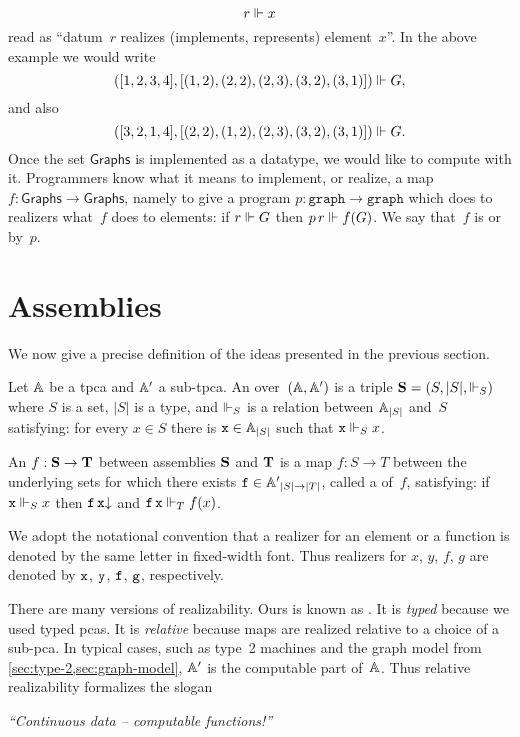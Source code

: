 %
\begin{equation*}
  r \rz x
\end{equation*}
%
read as ``datum~$r$ realizes (implements, represents) element~$x$''. In the above example we would write
%
\begin{equation*}
([1, 2, 3, 4], [(1,2), (2,2), (2,3), (3,2), (3,1)]) \rz G,
\end{equation*}
%
and also
%
\begin{equation*}
([3, 2, 1, 4], [(2,2), (1,2), (2,3), (3,2), (3,1)]) \rz G.
\end{equation*}
%
Once the set $\mathsf{Graphs}$ is implemented as a datatype, we would like to compute with it.
%
Programmers know what it means to implement, or realize, a map $f : \mathsf{Graphs} \to \mathsf{Graphs}$, namely to give a program $p : \mathtt{graph} \to \mathtt{graph}$ which does to realizers what~$f$ does to elements: if $r \rz G$ then $p \, r \rz f(G)$. We say that~$f$ is  or  by~$p$.

\section{Assemblies}
\label{sec:assemblies}

We now give a precise definition of the ideas presented in the previous section.

\begin{definition}
  Let $\AA$ be a tpca and $\subAA$ a sub-tpca. An  over~$(\AA, \subAA)$ is a triple
  $\asm{S} = \xasm{S}$ where $S$ is a set, $|S|$ is a type, and $\rz_S$ is a relation between $\xAtyp{S}$ and~$S$
  satisfying: for every $x \in S$ there is $\R{x} \in \xAtyp{S}$ such that $\R{x} \rz_S x$.

  An  $f : \asm{S} \to \asm{T}$ between assemblies $\asm{S}$ and $\asm{T}$ is a map $f : S \to T$
  between the underlying sets for which there exists $\R{f} \in \compAtyp{|S| \to |T|}$, called a 
  of~$f$, satisfying: if $\R{x} \rz_S x$ then $\defined{\R{f} \, \R{x}}$ and $\R{f} \, \R{x} \rz_T f(x)$.
\end{definition}

We adopt the notational convention that a realizer for an element or a function is denoted by the same letter in
fixed-width font. Thus realizers for $x$, $y$, $f$, $g$ are denoted by $\R{x}$, $\R{y}$, $\R{f}$, $\R{g}$, respectively.

There are many versions of realizability. Ours is known as . It is \emph{typed}
because we used typed pcas. It is \emph{relative} because maps are realized relative to a choice of a sub-pca. In
typical cases, such as type~2 machines and the graph model from \cref{sec:type-2,sec:graph-model}, $\subAA$ is the
computable part of~$\AA$. Thus relative realizability formalizes the slogan
%
\begin{center}
  \emph{``Continuous data -- computable functions!''}
\end{center}

